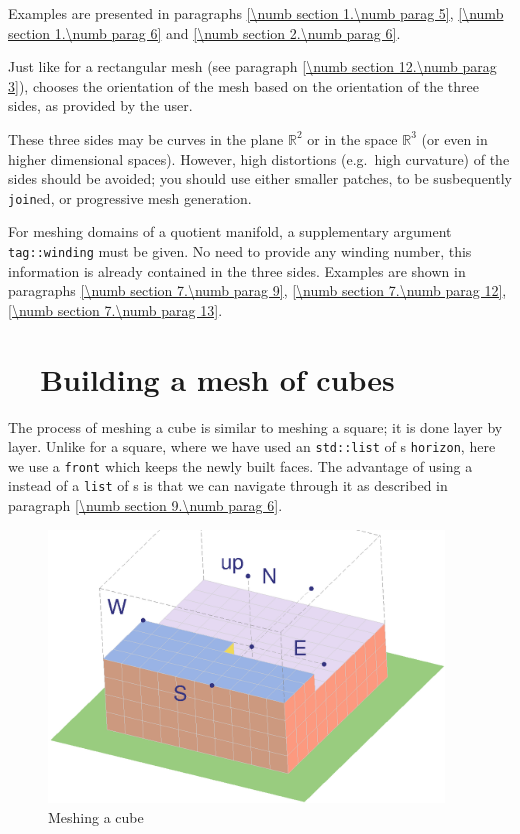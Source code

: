 Examples are presented in paragraphs \ref{\numb section 1.\numb parag 5},
\ref{\numb section 1.\numb parag 6} and \ref{\numb section 2.\numb parag 6}.

Just like for a rectangular mesh (see paragraph \ref{\numb section 12.\numb parag 3}),
{\maniFEM} chooses the orientation of the mesh based on the orientation of the three sides,
as provided by the user.

These three sides may be curves in the plane $ \mathbb{R}^2 $ or in the space $ \mathbb{R}^3 $
(or even in higher dimensional spaces).
However, high distortions (e.g.\ high curvature) of the sides should be avoided;
you should use either smaller patches, to be susbequently {\small\tt join}ed,
or progressive mesh generation.

For meshing domains of a quotient manifold, a supplementary argument
{\small\tt\textcolor{tag}{tag}::winding} must be given.
No need to provide any winding number, this information is already contained in the three sides.
Examples are shown in paragraphs \ref{\numb section 7.\numb parag 9},
\ref{\numb section 7.\numb parag 12}, \ref{\numb section 7.\numb parag 13}.


\section{~~Building a mesh of cubes}\label{\numb section 12.\numb parag 5}

The process of meshing a cube is similar to meshing a square; it is done layer by layer.
Unlike for a square, where we have used an {\small\tt std::list} of {\small\tt{}}s
{\small\tt horizon}, here we use a {\small\tt{}} {\small\tt front} which
keeps the newly built faces.
The advantage of using a {\small\tt{}} instead of a {\small\tt list} of
{\small\tt{}}s is that we can navigate through it as described in paragraph
\ref{\numb section 9.\numb parag 6}.

\begin{figure}[ht] \centering
  \includegraphics[width=105mm]{build-cube.eps}
  \caption{Meshing a cube}
  \label{\numb section 12.\numb fig 3}
\end{figure}


